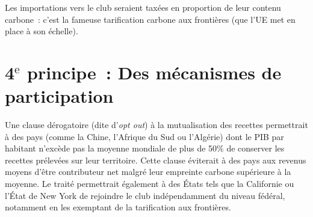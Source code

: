 \documentclass[a5paper,french]{memoir}
\begin{document}


Les importations vers le club seraient taxées en proportion de leur contenu carbone~: c'est la fameuse tarification carbone aux frontières (que l'UE met en place à son échelle). %

\section{4$^\text{e}$ principe~: Des mécanismes de participation}

Une clause dérogatoire (dite d'\textit{opt out}) à la mutualisation des recettes permettrait à des pays (comme la Chine, l'Afrique du Sud ou l'Algérie) dont le PIB par habitant n'excède pas la moyenne mondiale de plus de 50\% de conserver les recettes prélevées sur leur territoire. Cette clause éviterait à des pays aux revenus moyens d'être contributeur net malgré leur empreinte carbone supérieure à la moyenne.
Le traité permettrait également à des États tels que la Californie ou l'État de New York de rejoindre le club indépendamment du niveau fédéral, notamment en les exemptant de la tarification aux frontières.




\end{document}

